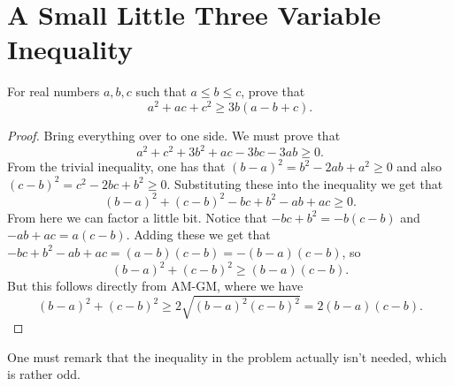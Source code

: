 \documentclass[a5paper]{article}
\begin{document}
\section*{A Small Little Three Variable Inequality}


\begin{blackbox}
    \begin{problem}
        For real numbers \( a, b, c \) such that \( a \le b \le c \), prove that
        \[
            a^2 + ac + c^2 \ge 3b (a - b + c)
        .\]
    \end{problem}
\end{blackbox}

\begin{proof}
Bring everything over to one side. We must prove that
\[
    a^2 + c^2 + 3b^2 + ac - 3bc - 3ab \ge 0
.\]
From the trivial inequality, one has that \( (b - a)^2 = b^2 - 2ab + a^2 \ge 0 \) and also \( (c - b)^2 = c^2 - 2bc + b^2 \ge 0 \). Substituting these into the inequality we get that
\[
    (b - a)^2 + (c - b)^2 - bc + b^2 - ab + ac \ge 0
.\]
From here we can factor a little bit. Notice that \( -bc + b^2 = - b(c - b) \) and \( -ab + ac = a(c - b) \). Adding these we get that \( -bc + b^2 - ab + ac = (a - b)(c - b) = -(b - a)(c - b) \), so
\[
    (b - a)^2 + (c-b)^2 \ge (b - a)(c - b)
.\]
But this follows directly from AM-GM, where we have
\[
    (b - a)^2 + (c - b)^2 \ge 2 \sqrt{(b - a)^2 (c - b)^2} = 2 (b-a)(c - b)
.\]
\end{proof}

One must remark that the inequality in the problem actually isn't needed, which
is rather odd.
\end{document}
